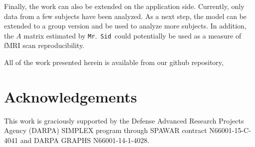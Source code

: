 \documentclass[times,twocolumn,final,authoryear]{elsarticle}
\newcommand{\mrsid}{{\sc \texttt{Mr}.~\texttt{Sid}}}
\begin{document}
Finally, the work can also be extended on the application side. Currently, only data from a few subjects have been analyzed. As a next step, the model can be extended to a group version and be used to analyze more subjects. In addition, the $A$ matrix estimated by \mrsid~could potentially be used as a measure of fMRI scan reproducibility.

All of the work presented herein is available from our github repository,

\section*{Acknowledgements}
This work is graciously supported by the Defense Advanced Research Projects Agency (DARPA) SIMPLEX program through SPAWAR contract N66001-15-C-4041 and DARPA GRAPHS N66001-14-1-4028.



\end{document}

